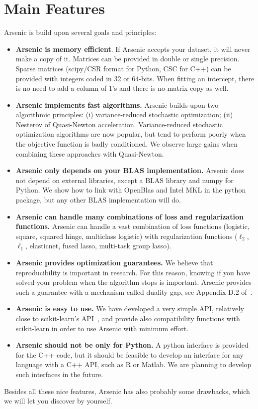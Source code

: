 \documentclass{article}
\begin{document}
\section{Main Features}
Arsenic is build upon several goals and principles:
\begin{itemize}
   \item {\textbf{Arsenic is memory efficient}}. If Arsenic accepts your dataset, it will never make a copy of it. Matrices can be provided in double or single precision. Sparse matrices (scipy/CSR format for Python, CSC for C++)
      can be provided with integers coded in 32 or 64-bits. When fitting an intercept, there is no need to add a column of 1's and there is no matrix copy as well. 
   \item {\textbf{Arsenic implements fast algorithms.}} Arsenic builds upon two algorithmic principles: (i) variance-reduced stochastic optimization; (ii) Nesterov of Quasi-Newton acceleration. Variance-reduced stochastic optimization algorithms are now popular, but tend to perform poorly when the objective function is badly conditioned. We observe large gains when combining these approaches with Quasi-Newton. 
   \item {\textbf{Arsenic only depends on your BLAS implementation.}} Arsenic does not depend on external libraries, except a BLAS library and numpy for Python. We show how to link with OpenBlas and Intel MKL in the python package, but any other BLAS implementation will do.
   \item {\textbf{Arsenic can handle many combinations of loss and regularization functions.}} Arsenic can handle a vast combination of loss functions (logistic, square, squared hinge, multiclass logistic) with regularization functions ($\ell_2$, $\ell_1$, elasticnet, fused lasso, multi-task group lasso).
   \item {\textbf{Arsenic provides optimization guarantees.}} We believe that reproducibility is important in research. For this reason, knowing if you have solved your problem when the algorithm stops is important. Arsenic provides such a guarantee with a mechanism called duality gap, see Appendix D.2 of~\citet{mairal2010sparse}.
   \item {\textbf{Arsenic is easy to use.}} We have developed a very simple API, relatively close to scikit-learn's API~\citep{scikit}, and provide also compatibility functions with scikit-learn in order to use Arsenic with minimum effort.
   \item {\textbf{Arsenic should not be only for Python.}} A python interface is provided for the C++ code, but it should be feasible to develop an interface for any language with a C++ API, such as R or Matlab. We are planning to develop such interfaces in the future.
\end{itemize}
Besides all these nice features, Arsenic has also probably some drawbacks, which we will let you discover by yourself.  
\end{document}
